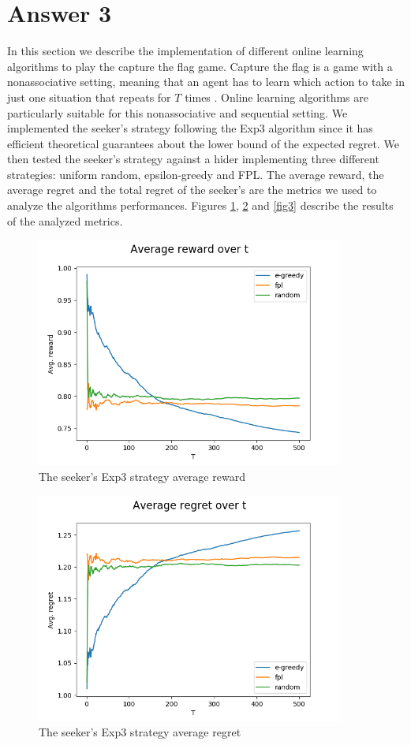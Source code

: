 \documentclass[runningheads]{llncs}
\begin{document}
\section{Answer 3}
In this section we describe the implementation of different online
learning algorithms to play the capture the flag game. Capture the
flag is a game with a nonassociative setting, meaning that an agent
has to learn which action to take in just one situation that repeats
for $T$ times \cite{rlbook}. Online learning algorithms are
particularly suitable for this nonassociative and sequential setting.
We implemented the seeker's strategy following the Exp3 algorithm
since it has efficient theoretical guarantees about the lower bound of
the expected regret. We then tested the seeker's strategy against a
hider implementing three different strategies: uniform random,
epsilon-greedy and FPL. The average reward, the average regret and the
total regret of the seeker's are the metrics we used to analyze the
algorithms performances. Figures \ref{fig1}, \ref{fig2} and \ref{fig3}
describe the results of the analyzed metrics. 
\begin{figure}[!htb]
    \centering
\includegraphics[width=0.9\textwidth]{img/Figure_1b.png}
\caption{The seeker's Exp3 strategy average reward}\label{fig1}
\end{figure}
\begin{figure}[!htb]
    \centering
\includegraphics[width=0.9\textwidth]{img/Figure_2b.png}
\caption{The seeker's Exp3 strategy average regret}\label{fig2}
\end{figure}
\end{document}
